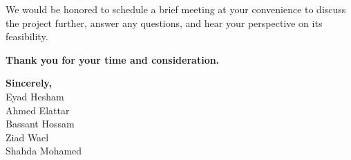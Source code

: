 \documentclass[12pt,a4paper]{article}
\begin{document}
We would be honored to schedule a brief meeting at your convenience to discuss the 
project further, answer any questions, and hear your perspective on its feasibility.  

\bigskip
\noindent
\textbf{Thank you for your time and consideration.}

\bigskip
\noindent
\textbf{Sincerely,} \\
Eyad Hesham \\
Ahmed Elattar \\
Bassant Hossam \\
Ziad Wael \\
Shahda Mohamed
\end{document}
